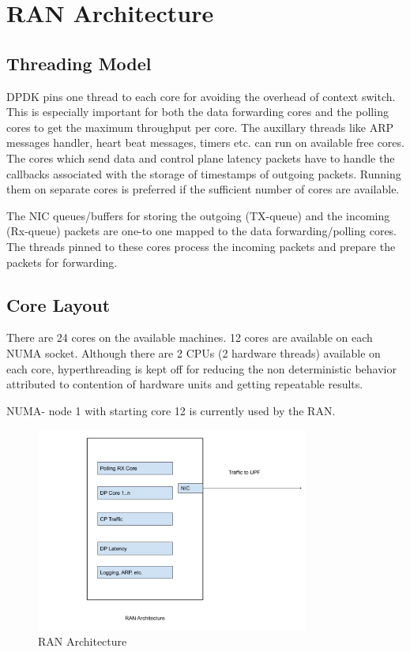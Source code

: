 \section{RAN Architecture}
\subsection{Threading Model}
DPDK pins one thread to each core for avoiding the overhead of context switch.
This is especially important for both the data forwarding cores and the polling
cores to get the maximum throughput per core. The auxillary threads like ARP
messages handler, heart beat messages, timers etc. can run on available free cores. The cores which send data and control plane latency packets have to handle the callbacks associated with the storage of timestamps of outgoing packets. Running them on separate cores is preferred if the sufficient number of cores are available.

The NIC queues/buffers for storing the outgoing (TX-queue) and the incoming
(Rx-queue) packets are one-to one mapped to the data forwarding/polling cores.
The threads pinned to these cores process the incoming packets and prepare the packets for forwarding.


\subsection{Core Layout}
There are 24 cores on the available machines. 12 cores are available on each NUMA socket.
Although there are 2 CPUs (2 hardware threads) available on each core, hyperthreading is
kept off for reducing the non deterministic behavior attributed to contention of hardware units
and getting repeatable results.

NUMA- node 1 with starting core 12 is currently used by the RAN.
\begin{figure}[htbp]
	\centering
	\includegraphics[width=0.8\textwidth, keepaspectratio]{./fig/Introduction/RANArchitecture.png}
	\caption{RAN Architecture}
	\label{fig:RAN}
\end{figure}

